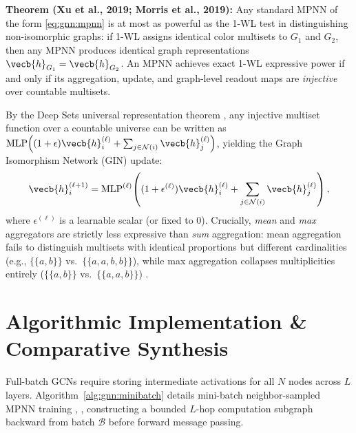 \documentclass[../../../../master.tex]{subfiles}
\begin{document}
\begin{coremath}
\label{box:gnn:gin}
\textbf{Theorem (Xu et al., 2019; Morris et al., 2019):} Any standard MPNN of the form \eqref{eq:gnn:mpnn} is at most as powerful as the 1-WL test in distinguishing non-isomorphic graphs: if 1-WL assigns identical color multisets to $G_1$ and $G_2$, then any MPNN produces identical graph representations $\vecb{h}_{G_1} = \vecb{h}_{G_2}$. An MPNN achieves exact 1-WL expressive power if and only if its aggregation, update, and graph-level readout maps are \emph{injective} over countable multisets.

By the Deep Sets universal representation theorem , any injective multiset function over a countable universe can be written as $\mathrm{MLP}\!\left((1+\epsilon)\vecb{h}_i^{(\ell)} + \sum_{j \in \mathcal{N}(i)} \vecb{h}_j^{(\ell)}\right)$, yielding the Graph Isomorphism Network (GIN) update:
\begin{equation}
  \vecb{h}_i^{(\ell+1)} = \mathrm{MLP}^{(\ell)}\!\left((1 + \epsilon^{(\ell)})\vecb{h}_i^{(\ell)} + \sum_{j \in \mathcal{N}(i)} \vecb{h}_j^{(\ell)}\right), \label{eq:gnn:gin}
\end{equation}
where $\epsilon^{(\ell)}$ is a learnable scalar (or fixed to $0$). Crucially, \emph{mean} and \emph{max} aggregators are strictly less expressive than \emph{sum} aggregation: mean aggregation fails to distinguish multisets with identical proportions but different cardinalities (e.g., $\{\!\!\{a, b\}\!\!\}$ vs.\ $\{\!\!\{a, a, b, b\}\!\!\}$), while max aggregation collapses multiplicities entirely ($\{\!\!\{a, b\}\!\!\}$ vs.\ $\{\!\!\{a, a, b\}\!\!\}$) .
\end{coremath}

\section{Algorithmic Implementation \& Comparative Synthesis}
\label{sec:gnn:algorithms}

Full-batch GCNs require storing intermediate activations for all $N$ nodes across $L$ layers. Algorithm~\ref{alg:gnn:minibatch} details mini-batch neighbor-sampled MPNN training , , constructing a bounded $L$-hop computation subgraph backward from batch $\mathcal{B}$ before forward message passing.
\end{document}
